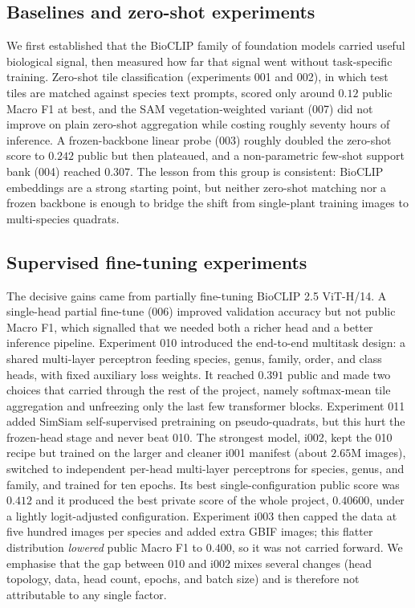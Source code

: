 
\subsection{Baselines and zero-shot experiments}
We first established that the BioCLIP family of foundation models carried useful
biological signal, then measured how far that signal went without task-specific
training. Zero-shot tile classification (experiments 001 and 002), in which test
tiles are matched against species text prompts, scored only around $0.12$ public
Macro F1 at best, and the SAM vegetation-weighted variant (007) did not improve on
plain zero-shot aggregation while costing roughly seventy hours of inference. A
frozen-backbone linear probe (003) roughly doubled the zero-shot score to $0.242$
public but then plateaued, and a non-parametric few-shot support bank (004) reached
$0.307$. The lesson from this group is consistent: BioCLIP embeddings are a strong
starting point, but neither zero-shot matching nor a frozen backbone is enough to
bridge the shift from single-plant training images to multi-species quadrats.

\subsection{Supervised fine-tuning experiments}
The decisive gains came from partially fine-tuning BioCLIP 2.5 ViT-H/14. A
single-head partial fine-tune (006) improved validation accuracy but not public
Macro F1, which signalled that we needed both a richer head and a better inference
pipeline. Experiment 010 introduced the end-to-end multitask design: a shared
multi-layer perceptron feeding species, genus, family, order, and class heads, with
fixed auxiliary loss weights. It reached $0.391$ public and made two choices that
carried through the rest of the project, namely softmax-mean tile aggregation and
unfreezing only the last few transformer blocks. Experiment 011 added SimSiam
self-supervised pretraining on pseudo-quadrats, but this hurt the frozen-head stage
and never beat 010. The strongest model, i002, kept the 010 recipe but trained on the
larger and cleaner i001 manifest (about $2.65$M images), switched to independent
per-head multi-layer perceptrons for species, genus, and family, and trained for ten
epochs. Its best single-configuration public score was $0.412$ and it produced the
best private score of the whole project, $0.40600$, under a lightly logit-adjusted
configuration. Experiment i003 then capped the data at five hundred images per
species and added extra GBIF images; this flatter distribution \emph{lowered} public
Macro F1 to $0.400$, so it was not carried forward. We emphasise that the gap between
010 and i002 mixes several changes (head topology, data, head count, epochs, and batch
size) and is therefore not attributable to any single factor.

